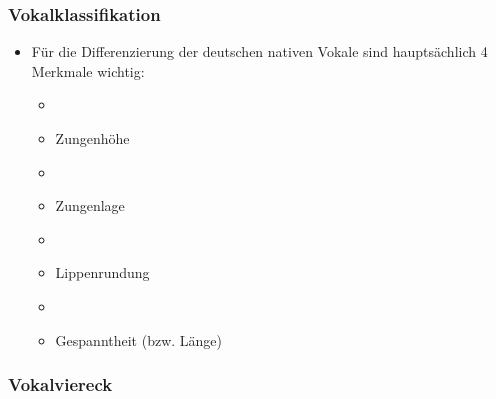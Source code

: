
\begin{frame}
\frametitle{Vokalklassifikation}

	\begin{itemize}
		\item Für die Differenzierung der deutschen nativen Vokale sind hauptsächlich 4 Merkmale wichtig:
		
		\begin{itemize}
			\item[]
			\item Zungenhöhe
			\item[]
			\item Zungenlage
			\item[]
			\item Lippenrundung
			\item[]
			\item Gespanntheit (bzw. Länge)
		\end{itemize}
		
	\end{itemize}
	
\end{frame}


%
\subsubsection{Vokalviereck}

